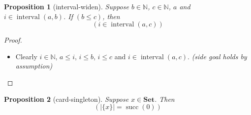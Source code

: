 \documentclass[11pt]{article}
\theoremstyle{plain}
\newtheorem{proposition}{Proposition}
\begin{document}
\bigskip

\begin{proposition}[interval-widen]
Suppose $b \in \mathbb{N}$, $c \in \mathbb{N}$, $a$ and $i \in \operatorname{interval}(a, b)$. If $(b \leq c)$, then 
\begin{equation*}
(i \in \operatorname{interval}(a, c))
\end{equation*}

\end{proposition}

\begin{proof}
\begin{itemize}[leftmargin=2.8em, itemsep=4pt, parsep=1pt]
  \item[\textbf{3--8}] Clearly $i \in \mathbb{N}$, $a \leq i$, $i \leq b$, $i \leq c$ and $i \in \operatorname{interval}(a, c)$.  \emph{(side goal holds by assumption)}
\end{itemize}
\end{proof}

\bigskip

\begin{proposition}[card-singleton]
Suppose $x \in \mathbf{Set}$. Then
\begin{equation*}
(|\{x\}| = \operatorname{succ}(0))
\end{equation*}

\end{proposition}
\end{document}

